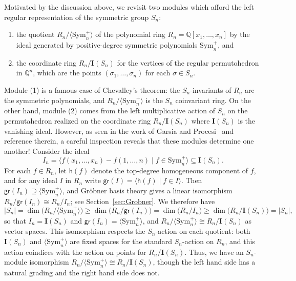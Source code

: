 \documentclass[12pt]{amsart}
\theoremstyle{definition}
\theoremstyle{remark}
\numberwithin{equation}{section}
\newcommand{\QQ}{\mathbb{Q}}
\newcommand{\Sym}{\mathrm{Sym}}
\begin{document}
Motivated by the discussion above, we revisit two modules which afford the left regular representation of the symmetric group $S_{n}$:
\begin{enumerate}[itemsep = 1ex]
\item the quotient $R_{n}\big/\langle \Sym_{n}^{+} \rangle$ of the polynomial ring $R_{n} = \QQ[x_{1}, \ldots, x_{n}]$ by the ideal generated by positive-degree symmetric polynomials $\Sym_{n}^{+}$, and

\item the coordinate ring $R_{n} \big/ \mathbf{I}(S_{n})$ for the vertices of the regular permutohedron in $\QQ^{n}$, which are the points $(\sigma_{1}, \ldots, \sigma_{n})$ for each $\sigma \in S_{n}$.

\end{enumerate}
Module (1) is a famous case of Chevalley's theorem: the $S_{n}$-invariants of $R_{n}$ are the symmetric polynomials, and $R_{n}\big/\langle \Sym_{n}^{+} \rangle$ is the $S_{n}$ coinvariant ring.  
On the other hand, module (2) comes from the left multiplicative action of $S_{n}$ on the permutahedron realized on the coordinate ring $R_{n} \big/ \mathbf{I}(S_{n})$  where $\mathbf{I}(S_{n})$ is the vanishing ideal. 
However, as seen in the work of Garsia and Procesi~\cite{GP} and reference therein, a careful inspection reveals that these modules determine one another!  
Consider the ideal
\[
I_{n} = \langle f(x_{1}, \ldots, x_{n}) - f(1, \ldots, n) \;|\; f \in \Sym_{n}^{+} \rangle \subseteq \mathbf{I}(S_{n}).
\]
For each $f \in R_{n}$, let $\mathsf{h}(f)$ denote the top-degree homogeneous component of $f$, and for any ideal $I$ in $R_{n}$ write $\mathsf{gr}(I) = \langle \mathsf{h}(f) \;|\; f \in I \rangle$.  
Then $\mathsf{gr}(I_{n}) \supseteq \langle \Sym_{n}^{+} \rangle$, and Gr\"{o}bner basis theory gives a linear isomorphism $R_{n}\big/\mathsf{gr}(I_{n})  \cong R_{n}\big/I_{n}$; see Section~\ref{sec:Grobner}.  We therefore have
\[
|S_{n}| = \dim\big(R_{n}\big/\langle \Sym_{n}^{+} \rangle\big) \ge \dim\big(R_{n}\big/\mathsf{gr}(I_{n})\big) = \dim\big(R_{n}\big/I_{n}) \ge \dim(R_{n}\big/\mathbf{I}(S_{n})\big) = |S_{n}|,
\]
so that $I_{n} = \mathbf{I}(S_{n})$ and $\mathsf{gr}(I_{n}) = \langle \Sym_{n}^{+} \rangle$, and $R_{n}\big/\langle \Sym_{n}^{+} \rangle \cong R_{n}\big/\mathbf{I}(S_{n})$ as vector spaces.  
This isomorphism respects the $S_{n}$-action on each quotient: both $\mathbf{I}(S_{n})$ and $\langle \Sym_{n}^{+} \rangle$ are fixed spaces for the standard $S_{n}$-action on $R_{n}$, and this action coindices with the action on points for $R_{n}\big/\mathbf{I}(S_{n})$.  
Thus, we have an $S_{n}$-module isomorphism $R_{n}\big/\langle \Sym_{n}^{+} \rangle \cong R_{n}\big/\mathbf{I}(S_{n})$, though the left hand side has a natural grading and the right hand side does not.
\end{document}
